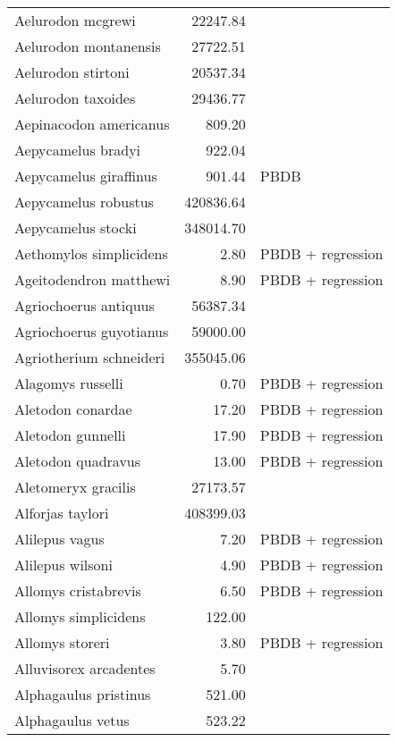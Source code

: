 \begin{table}[ht]
\begin{tabular}{lrl}
  Aelurodon mcgrewi & 22247.84 & \cite{Tomiya2013} \\ 
  Aelurodon montanensis & 27722.51 & \cite{Tomiya2013} \\ 
  Aelurodon stirtoni & 20537.34 & \cite{Tomiya2013} \\ 
  Aelurodon taxoides & 29436.77 & \cite{Tomiya2013} \\ 
  Aepinacodon americanus & 809.20 & \cite{Baskin2011} \\ 
  Aepycamelus bradyi & 922.04 & \cite{Dawson2012} \\ 
  Aepycamelus giraffinus & 901.44 & PBDB \\ 
  Aepycamelus robustus & 420836.64 & \cite{Tomiya2013} \\ 
  Aepycamelus stocki & 348014.70 & \cite{Tomiya2013} \\ 
  Aethomylos simplicidens & 2.80 & PBDB + regression \\ 
  Ageitodendron matthewi & 8.90 & PBDB + regression \\ 
  Agriochoerus antiquus & 56387.34 & \cite{Tomiya2013} \\ 
  Agriochoerus guyotianus & 59000.00 & \cite{McKenna2011} \\ 
  Agriotherium schneideri & 355045.06 & \cite{Tomiya2013} \\ 
  Alagomys russelli & 0.70 & PBDB + regression \\ 
  Aletodon conardae & 17.20 & PBDB + regression \\ 
  Aletodon gunnelli & 17.90 & PBDB + regression \\ 
  Aletodon quadravus & 13.00 & PBDB + regression \\ 
  Aletomeryx gracilis & 27173.57 & \cite{Tomiya2013} \\ 
  Alforjas taylori & 408399.03 & \cite{Tomiya2013} \\ 
  Alilepus vagus & 7.20 & PBDB + regression \\ 
  Alilepus wilsoni & 4.90 & PBDB + regression \\ 
  Allomys cristabrevis & 6.50 & PBDB + regression \\ 
  Allomys simplicidens & 122.00 & \cite{McKenna2011} \\ 
  Allomys storeri & 3.80 & PBDB + regression \\ 
  Alluvisorex arcadentes & 5.70 & \cite{Tomiya2013} \\ 
  Alphagaulus pristinus & 521.00 & \cite{McKenna2011} \\ 
  Alphagaulus vetus & 523.22 & \cite{Tomiya2013} \\ 

\end{tabular}
\end{table}
